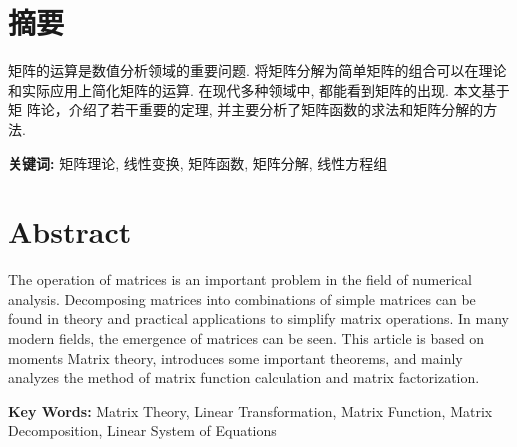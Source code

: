 \section*{ \centering 摘要}

\vskip0.5cm
矩阵的运算是数值分析领域的重要问题. 将矩阵分解为简单矩阵的组合可以在理论
和实际应用上简化矩阵的运算. 在现代多种领域中, 都能看到矩阵的出现. 本文基于矩
阵论，介绍了若干重要的定理, 并主要分析了矩阵函数的求法和矩阵分解的方法.


\textbf{关键词:} 矩阵理论, 线性变换, 矩阵函数, 矩阵分解, 线性方程组

\clearpage
\section*{ \centering \textbf{Abstract} }

The operation of matrices is an important problem in the field of numerical analysis.
Decomposing matrices into combinations of simple matrices can be found in theory and
practical applications to simplify matrix operations. In many modern fields, the emergence
of matrices can be seen. This article is based on moments Matrix theory, introduces
some important theorems, and mainly analyzes the method of matrix function calculation
and matrix factorization.

\textbf{Key Words:} Matrix Theory, Linear Transformation, Matrix Function, Matrix Decomposition, Linear System of Equations




